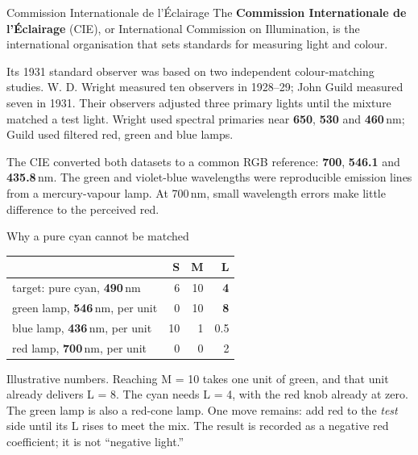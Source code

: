 \documentclass[aspectratio=169,11pt]{beamer}
\begin{document}
\begin{frame}{Commission Internationale de l'Éclairage}
  \small
  The \textbf{Commission Internationale de l'Éclairage} (CIE), or
  International Commission on Illumination, is the international organisation
  that sets standards for measuring light and colour.
  \vspace{0.5em}

  Its 1931 standard observer was based on two independent colour-matching
  studies. W. D. Wright measured ten observers in 1928--29; John Guild
  measured seven in 1931. Their observers adjusted three primary lights until
  the mixture matched a test light. Wright used spectral primaries near
  \textcolor{cwred}{\textbf{650}}, \textcolor{cwgreen}{\textbf{530}} and
  \textcolor{scone}{\textbf{460}}\,nm; Guild used filtered red, green and blue
  lamps.
  \vspace{0.5em}

  The CIE converted both datasets to a common RGB reference:
  \textcolor{cwred}{\textbf{700}}, \textcolor{cwgreen}{\textbf{546.1}} and
  \textcolor{scone}{\textbf{435.8}}\,nm. The green and violet-blue
  wavelengths were reproducible emission lines from a mercury-vapour lamp.
  At 700\,nm, small wavelength errors make little difference to the
  perceived red.
\end{frame}

\begin{frame}{Why a pure cyan cannot be matched}
  \small
  {\centering
  \begin{tabular}{@{}lrrr@{}}
    \toprule
     & S & M & L \\
    \midrule
    target: pure cyan, \textcolor{vgacyan}{\textbf{490}}\,nm & 6 & 10 & \textbf{4} \\
    green lamp, \textcolor{cwgreen}{\textbf{546}}\,nm, per unit & 0 & 10 & \textbf{8} \\
    blue lamp, \textcolor{scone}{\textbf{436}}\,nm, per unit & 10 & 1 & 0.5 \\
    red lamp, \textcolor{cwred}{\textbf{700}}\,nm, per unit & 0 & 0 & 2 \\
    \bottomrule
  \end{tabular}
  \par}
  \vspace{0.8em}

  Illustrative numbers. Reaching M = 10 takes one unit of green, and that
  unit already delivers L = 8. The cyan needs L = 4, with the red knob
  already at zero. The green lamp is also a red-cone lamp.
  One move remains: add red to the \emph{test} side until its L rises to
  meet the mix. The result is recorded as a negative red coefficient; it is
  not ``negative light.''
\end{frame}
\end{document}
